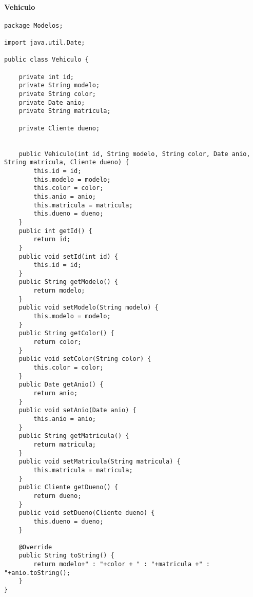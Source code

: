 \paragraph{Vehiculo}
\begin{lstlisting}
package Modelos;

import java.util.Date;

public class Vehiculo {
	
	private int id;
	private String modelo;
	private String color;
	private Date anio;
	private String matricula;

	private Cliente dueno;
	
	
	public Vehiculo(int id, String modelo, String color, Date anio, String matricula, Cliente dueno) {
		this.id = id;
		this.modelo = modelo;
		this.color = color;
		this.anio = anio;
		this.matricula = matricula;
		this.dueno = dueno;
	}
	public int getId() {
		return id;
	}
	public void setId(int id) {
		this.id = id;
	}
	public String getModelo() {
		return modelo;
	}
	public void setModelo(String modelo) {
		this.modelo = modelo;
	}
	public String getColor() {
		return color;
	}
	public void setColor(String color) {
		this.color = color;
	}
	public Date getAnio() {
		return anio;
	}
	public void setAnio(Date anio) {
		this.anio = anio;
	}
	public String getMatricula() {
		return matricula;
	}
	public void setMatricula(String matricula) {
		this.matricula = matricula;
	}
	public Cliente getDueno() {
		return dueno;
	}
	public void setDueno(Cliente dueno) {
		this.dueno = dueno;
	}
	
	@Override
	public String toString() {
		return modelo+" : "+color + " : "+matricula +" : "+anio.toString();
	}	
}
\end{lstlisting}
\clearpage

